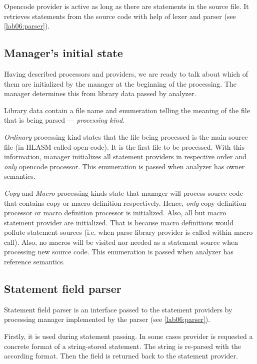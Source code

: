 Opencode provider is active as long as there are statements in the source file. It retrieves statements from the source code with help of lexer and parser (see \cref{lab06:parser}).

\subsection{Manager's initial state}
\label{lab06:lib_data}
Having described processors and providers, we are ready to talk about which of them are initialized by the manager at the beginning of the processing. The manager determines this from library data passed by analyzer.

Library data contain a file name and enumeration telling the meaning of the file that is being parsed --- \emph{processing kind}.

\emph{Ordinary} processing kind states that the file being processed is the main source file (in HLASM called open-code). It is the first file to be processed. With this information, manager initializes all statement providers in respective order and \emph{only} opencode processor. This enumeration is passed when analyzer has owner semantics.

\emph{Copy} and \emph{Macro} processing kinds state that manager will process source code that contains copy or macro definition respectively. Hence, \emph{only} copy definition processor or macro definition processor is initialized. Also, all but macro statement provider are initialized. That is because macro definitions would pollute statement sources (i.e. when parse library provider is called within macro call). Also, no macros will be visited nor needed as a statement source when processing new source code. This enumeration is passed when analyzer has reference semantics.


\subsection{Statement field parser}
\label{lab06:field_parser}

Statement field parser is an interface passed to the statement providers by processing manager implemented by the parser (see \cref{lab06:parser}).

Firstly, it is used during statement passing. In some cases provider is requested a concrete format of a string-stored statement. The string is re-parsed with the according format. Then the field is returned back to the statement provider. 

